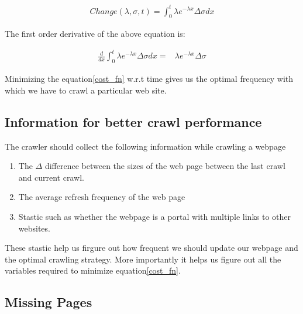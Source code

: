 \documentclass{article}
\begin{document}
\begin{align}
  \label{change_eq}
  Change(\lambda, \sigma, t) = \int_{0}^{t} \lambda e^{-\lambda x}\Delta\sigma dx
\end{align}

The first order derivative of the above equation is:

\begin{align}
  \label{cost_fn}
  \frac{d}{dx} \int_{0}^{t} \lambda e^{-\lambda x} \Delta \sigma dx =& \lambda e^{-\lambda x}\Delta\sigma
\end{align}

Minimizing the equation\eqref{cost_fn} w.r.t time gives us the optimal frequency with which we have to crawl a particular web site.

\subsection{Information for better crawl performance}
The crawler should collect the following information while crawling a webpage
\begin{enumerate}
  \item The $\Delta $ difference between the sizes of the web page between the last crawl and current crawl.
  \item The average refresh frequency of the web page
  \item Stastic such as whether the webpage is a portal with multiple links to other websites.
\end{enumerate}
These stastic help us firgure out how frequent we should update our webpage and the optimal crawling strategy.  More importantly it helps us figure out all the variables required to minimize equation\eqref{cost_fn}.

\subsection{Missing Pages}
\end{document}
